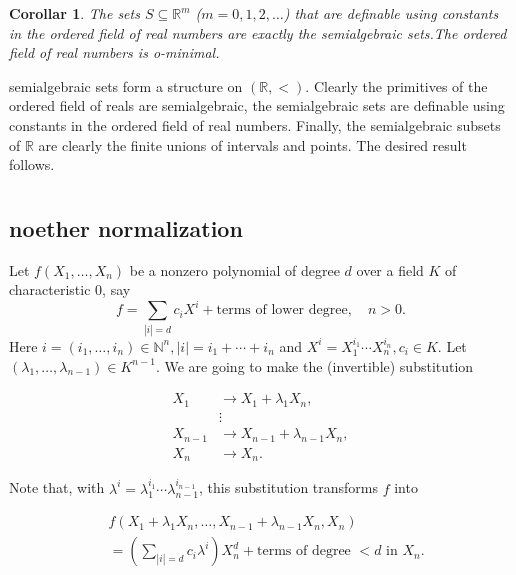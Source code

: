 \documentclass[12pt]{article}
\theoremstyle{mythm}
\let\oldendproof\endproof
\renewenvironment{proof}[1][\proofname]{%
  \oldproof[\normalfont \bfseries \sffamily #1]%
}{\oldendproof}
\renewcommand*{\proofname}{Proof}
\renewcommand*{\proofname}{Proof}
\newtheorem{cor}{Corollar}[section]
\renewcommand*{\proofname}{Proof}
\renewcommand*{\proofname}{Proof}
\renewcommand*{\proofname}{Proof}
\renewcommand*{\proofname}{Proof}
\renewcommand*{\proofname}{Proof}
\newcommand{\R}{\mathbb{R}}
\begin{document}
\begin{cor}
The sets $S \subseteq \R^m$ ($m = 0, 1, 2, \ldots$) that are definable using constants in the ordered field of real numbers are exactly the semialgebraic sets.The ordered field of real numbers is o-minimal.
\end{cor}
\begin{proof}
   
 semialgebraic sets form a structure on \((\mathbb{R}, <)\). Clearly the primitives of the ordered field of reals are semialgebraic, the semialgebraic sets are definable using constants in the ordered field of real numbers. Finally, the semialgebraic subsets of \(\mathbb{R}\) are clearly the finite unions of intervals and points. The desired result follows.



\end{proof}


\section{}
\subsection{noether normalization}

Let \( f(X_1, \ldots, X_n) \) be a nonzero polynomial of degree \( d \) over a field \( K \) of characteristic 0, say 
\[
f = \sum_{|i|=d} c_i X^i + \text{terms of lower degree}, \quad n > 0.
\]
Here \( i = (i_1, \ldots, i_n) \in \mathbb{N}^n, |i| = i_1 + \cdots + i_n \) and \( X^i = X_1^{i_1} \cdots X_n^{i_n}, c_i \in K \). Let \( (\lambda_1, \ldots, \lambda_{n-1}) \in K^{n-1} \). We are going to make the (invertible) substitution

\begin{align*}
X_1 &\to X_1 + \lambda_1 X_n, \\
&\vdots \\
X_{n-1} &\to X_{n-1} + \lambda_{n-1} X_n, \\
X_n &\to X_n.
\end{align*}

Note that, with \(\lambda^i = \lambda_1^{i_1} \cdots \lambda_{n-1}^{i_{n-1}}\), this substitution transforms \(f\) into

\begin{align*}
&f(X_1 + \lambda_1 X_n, \ldots, X_{n-1} + \lambda_{n-1} X_n, X_n) \\
&= \left( \sum_{|i|=d} c_i \lambda^i \right) X_n^d + \text{terms of degree } < d \text{ in } X_n.
\end{align*}
\end{document}
